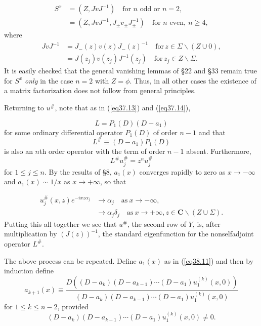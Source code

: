 \documentclass{surv-l}
\theoremstyle{plain}
\theoremstyle{definition}
\numberwithin{equation}{chapter}
\begin{document}
\begin{align*}
S^{x}&=(Z, JvJ^{-1})\quad\text{for }n \text{ odd or } n=2,\\
&=(Z, JvJ^{-1}, J_{\pm} v_{\pm} J_{\pm}^{-1}) \quad  \text{for $n$ even},\ n\geq 4,
\end{align*}
where
\begin{align*}
JvJ^{-1}& =J_{-}(z)v(z)J_{-}(z)^{-1} \quad \mathrm{for}\, z\in\Sigma\backslash (Z\cup 0),\\
& =J(z_{j})v(z_{j})J^{-1}(z_{j})\quad  \mathrm{for}\,  z_{j}\in Z\backslash \Sigma.
\end{align*}
It is easily checked that the general vanishing lemmas of \S 22 and \S 33 remain true for $S^{x}$ \emph{only} in the case $n =2$ with $ Z=\phi$. Thus, in all other cases the existence of a matrix factorization does not follow from general principles.

Returning to $u^{\#}$, note that as in (\ref{eq37.13}) and (\ref{eq37.14}),

\begin{equation}\label{eq38.18}
L=P_{1}(D)(D-a_{1})
\end{equation}
for some ordinary differential operator $P_{1}(D)$ of order $n -1$ and that
\begin{equation}\label{eq38.19}
L^{\#}\equiv(D-a_{1})P_{1}(D)
\end{equation}
is also an $n$th order operator with the term of order $n-1$ absent. Furthermore,
\begin{equation*}
L^{\#}u_{j}^{\#}=z^{n}u_{j}^{\#}
\end{equation*}
for $1\leq j\leq n$. By the results of \S 8, $a_{1}(x)$ converges rapidly to zero as $ x\rightarrow-\infty$ and $a_{1}(x)\sim 1/x$ as $ x\rightarrow+\infty$, so that

\begin{align*}
u_{j}^{\#}(x, z)e^{-ixz\alpha_{j}}& \rightarrow\alpha_{j} \quad  \mathrm{as}\  x\rightarrow-\infty, \\
& \rightarrow\alpha_{j}\delta_{j} \quad  \mathrm{as}\  x\rightarrow+\infty, z\in \textbf{C}\backslash (Z\cup\Sigma).
\end{align*}
Putting this all together we see that $u^{\#}$, the second row of $Y$, is, after multiplication by $(J(z))^{-1}$, the standard eigenfunction for the nonselfadjoint operator $L^{\#}$.

The above process can be repeated. Define $a_{1}(x)$ as in (\ref{eq38.11}) and then by induction define
\begin{equation}\label{eq38.20}
a_{k+1}(x)\equiv\frac{D((D-a_{k})(D-a_{k-1})\cdots(D-a_{1})u_{1}^{(k)}(x,0))}{(D-a_{k})(D-a_{k-1})\cdots(D-a_{1})u_{1}^{(k)}(x,0)}
\end{equation}
for $1\leq k\leq n-2$, provided
\begin{equation}\label{eq38.21}
(D-a_{k})(D-a_{k-1})\cdots(D-a_{1})u_{1}^{(k)}(x, 0)\neq 0.
\end{equation}
\end{document}
